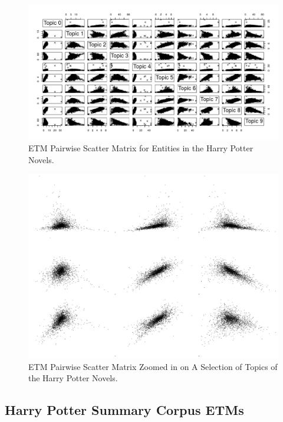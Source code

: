 \documentclass[10pt]{report}
\begin{document}
\begin{figure}[h!]
  \centering
  \includegraphics[scale=0.5]{hp_etms}
  \caption{ETM Pairwise Scatter Matrix for Entities in the Harry Potter Novels.\label{fig:hp_etm}}
\end{figure}

\begin{figure}[h!]
  \centering
  \includegraphics[scale=0.10]{etm_closeup}
  \caption{ETM Pairwise Scatter Matrix Zoomed in on A Selection of Topics of the Harry Potter Novels. \label{fig:etm_closeup}}
\end{figure}


\clearpage
\subsection{Harry Potter Summary Corpus ETMs}
\end{document}
